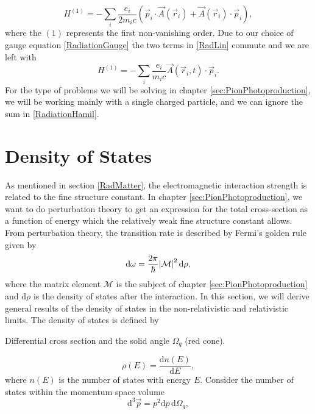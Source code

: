 \begin{equation} \label{RadLin}
	H^{(1)} = -\sum_i \frac{e_i}{2m_i c} (\vec{p}_i\cdot \vec{A}(\vec{r}_i)+\vec{A}(\vec{r}_i)\cdot \vec{p}_i),
\end{equation}
where the $(1)$ represents the first non-vanishing order. Due to our choice of gauge equation \eqref{RadiationGauge} the two terms in \eqref{RadLin} commute and we are left with
\begin{equation} \label{RadiationHamil}
	H^{(1)} = - \sum_i \frac{e_i}{m_i c} \vec{A}(\vec{r}_i,t)\cdot\vec{p}_i.
\end{equation}
For the type of problems we will be solving in chapter \ref{sec:PionPhotoproduction}, we will be working mainly with a single charged particle, and we can ignore the sum in \eqref{RadiationHamil}.
\section{Density of States}\label{sec:densityofstates}
As mentioned in section \ref{RadMatter}, the electromagnetic interaction strength is related to the fine structure constant. In chapter \ref{sec:PionPhotoproduction}, we want to do perturbation theory to get an expression for the total cross-section as a function of energy which the relatively weak fine structure constant allows. From perturbation theory, the transition rate is described by Fermi's golden rule given by
\begin{equation} \label{FermiGolden}
	\text{d}\omega = \frac{2\pi}{\hbar}\abs{\mathcal{M}}^2 \text{d}\rho,
\end{equation}
where the matrix element $\mathcal{M}$ is the subject of chapter \ref{sec:PionPhotoproduction} and $\text{d}\rho$ is the density of states after the interaction. In this section, we will derive general results of the density of states in the non-relativistic and relativistic limits. The density of states is defined by
\begin{marginfigure}
	\centering
	
	\caption{Differential cross section and the solid angle $\Omega_q$ (red cone).}
	\label{fig:diffcross}
\end{marginfigure}
\begin{equation} \label{DensityOfStates}
	\rho(E) = \frac{\text{d}n(E)}{\text{d}E},
\end{equation}
where $n(E)$ is the number of states with energy $E$. Consider the number of states within the momentum space volume
\begin{equation} \label{momspace}
	\text{d}^3\vec{p} = p^2 \text{d}p \, \text{d}\Omega_q,
\end{equation}
